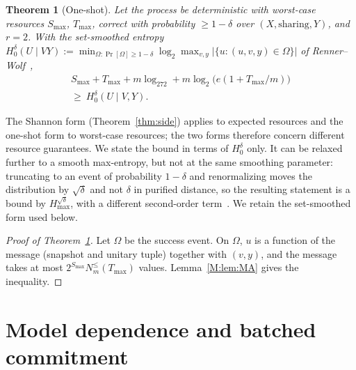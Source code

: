 \documentclass[aps,prx,twocolumn,superscriptaddress,nofootinbib,longbibliography]{revtex4-2}
\theoremstyle{plain}
\newtheorem{theorem}{Theorem}
\theoremstyle{definition}
\theoremstyle{remark}
\begin{document}
\begin{theorem}[One-shot]\label{thm:oneshot}
Let the process be deterministic with worst-case resources $S_{\max}$, $T_{\max}$, correct with probability $\ge1-\delta$ over $(X,\text{sharing},Y)$, and $r=2$. With the set-smoothed entropy $H_0^\delta(U\mid VY):=\min_{\Omega:\Pr[\Omega]\ge1-\delta}\log_2\max_{v,y}|\{u:(u,v,y)\in\Omega\}|$ of Renner--Wolf~\cite{RennerWolf},
\begin{multline}
S_{\max}+T_{\max}+m\log_272+m\log_2\!\big(e(1+T_{\max}/m)\big)\\
\ge\ H_0^\delta(U\mid V,Y).
\end{multline}
\end{theorem}
The Shannon form (Theorem~\ref{thm:side}) applies to expected resources and the one-shot form to worst-case resources; the two forms therefore concern different resource guarantees. We state the bound in terms of $H_0^\delta$ only. It can be relaxed further to a smooth max-entropy, but not at the same smoothing parameter: truncating to an event of probability $1-\delta$ and renormalizing moves the distribution by $\sqrt\delta$ and not $\delta$ in purified distance, so the resulting statement is a bound by $H^{\sqrt\delta}_{\max}$, with a different second-order term~\cite{TomamichelHayashi}. We retain the set-smoothed form used below.

\begin{proof}[Proof of Theorem~\ref{thm:oneshot}]
Let $\Omega$ be the success event. On $\Omega$, $u$ is a function of the message (snapshot and unitary tuple) together with $(v,y)$, and the message takes at most $2^{S_{\max}}N^{\le}_m(T_{\max})$ values. Lemma~\ref{M:lem:MA} gives the inequality.
\end{proof}

\section{Model dependence and batched commitment}\label{sec:modelsupp}
\end{document}
